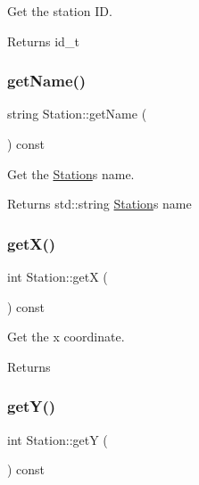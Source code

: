 Get the station ID. 

\begin{DoxyReturn}{Returns}
id\+\_\+t 
\end{DoxyReturn}
\mbox{\label{classStation_ac823ae175ec0e2baff462ed9612c7bae}} 
\subsubsection{\texorpdfstring{get\+Name()}{getName()}}
{\footnotesize\ttfamily string Station\+::get\+Name (\begin{DoxyParamCaption}{ }\end{DoxyParamCaption}) const}



Get the \mbox{\hyperlink{classStation}{Station}}\textquotesingle{}s name. 

\begin{DoxyReturn}{Returns}
std\+::string \mbox{\hyperlink{classStation}{Station}}\textquotesingle{}s name 
\end{DoxyReturn}
\mbox{\label{classStation_a2205a1288789260beee59fd3532286e9}} 
\subsubsection{\texorpdfstring{get\+X()}{getX()}}
{\footnotesize\ttfamily int Station\+::getX (\begin{DoxyParamCaption}{ }\end{DoxyParamCaption}) const}

Get the x coordinate. \begin{DoxyReturn}{Returns}

\end{DoxyReturn}
\mbox{\label{classStation_a28c75f35db1f6a1d3ed0488f2effbfb4}} 
\subsubsection{\texorpdfstring{get\+Y()}{getY()}}
{\footnotesize\ttfamily int Station\+::getY (\begin{DoxyParamCaption}{ }\end{DoxyParamCaption}) const}

